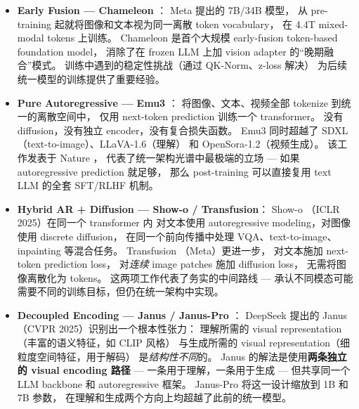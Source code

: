 \begin{itemize}[leftmargin=2em]
  \item \textbf{Early Fusion --- Chameleon} \cite{team2024chameleon}：
    Meta 提出的 7B/34B 模型，
    从 pre-training 起就将图像和文本视为同一离散 token vocabulary，
    在 4.4T mixed-modal tokens 上训练。
    Chameleon 是首个大规模 early-fusion token-based foundation model，
    消除了在 frozen LLM 上加 vision adapter 的``晚期融合''模式。
    训练中遇到的稳定性挑战（通过 QK-Norm、z-loss 解决）
    为后续统一模型的训练提供了重要经验。

  \item \textbf{Pure Autoregressive --- Emu3} \cite{wang2024emu3}：
    将图像、文本、视频全部 tokenize 到统一的离散空间中，
    仅用 next-token prediction 训练一个 transformer。
    没有 diffusion，没有独立 encoder，没有复合损失函数。
    Emu3 同时超越了 SDXL（text-to-image）、LLaVA-1.6（理解）
    和 OpenSora-1.2（视频生成）。
    该工作发表于 Nature \cite{wang2024emu3}，
    代表了统一架构光谱中最极端的立场 ---
    如果 autoregressive prediction 就足够，
    那么 post-training 可以直接复用 text LLM 的全套 SFT/RLHF 机制。

  \item \textbf{Hybrid AR + Diffusion --- Show-o / Transfusion}：
    Show-o \cite{xie2024showo}（ICLR 2025）在同一个 transformer 内
    对文本使用 autoregressive modeling，对图像使用 discrete diffusion，
    在同一个前向传播中处理 VQA、text-to-image、inpainting 等混合任务。
    Transfusion \cite{zhou2024transfusion}（Meta）更进一步，
    对文本施加 next-token prediction loss，
    对\textit{连续} image patches 施加 diffusion loss，
    无需将图像离散化为 tokens。
    这两项工作代表了务实的中间路线 ---
    承认不同模态可能需要不同的训练目标，但仍在统一架构中实现。

  \item \textbf{Decoupled Encoding --- Janus / Janus-Pro} \cite{chen2024janus,chen2025januspro}：
    DeepSeek 提出的 Janus（CVPR 2025）识别出一个根本性张力：
    理解所需的 visual representation（丰富的语义特征，如 CLIP 风格）
    与生成所需的 visual representation（细粒度空间特征，用于解码）
    是\textit{结构性不同}的。
    Janus 的解法是使用\textbf{两条独立的 visual encoding 路径} ---
    一条用于理解，一条用于生成 ---
    但共享同一个 LLM backbone 和 autoregressive 框架。
    Janus-Pro 将这一设计缩放到 1B 和 7B 参数，
    在理解和生成两个方向上均超越了此前的统一模型。
\end{itemize}

